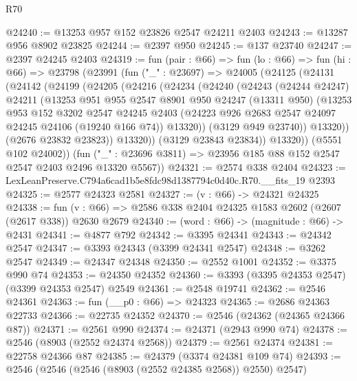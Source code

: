 \begin{lexlean}{R70}
\begin{coremodule}
@24240 := @13253 @957 @152 @23826 @2547 @24211 @2403
@24243 := @13287 @956 @8902 @23825
@24244 := @2397 @950
@24245 := @137 @23740
@24247 := @2397 @24245 @2403
@24319 := fun (pair : @66) =>
  fun (lo : @66) =>
  fun (hi : @66) =>
  @23798
    (@23991
      (fun ("_" : @23697) =>
      @24005
        (@24125
          (@24131
            (@24142
              (@24199
                (@24205
                  (@24216
                    (@24234
                      (@24240
                        (@24243
                          (@24244 @24247)
                          @24211
                          (@13253
                            @951
                            @955
                            @2547
                            @8901
                            @950
                            @24247
                            (@13311 @950)
                            (@13253
                              @953
                              @152
                              @3202
                              @2547
                              @24245
                              @2403
                              (@24223 @926 @2683 @2547 @24097 @24245 @24106 (@19240 @166 @74))
                              @13320))
                          (@3129 @949 @23740))
                        @13320))
                    (@2676 @23832 @23823))
                  @13320))
              (@3129 @23843 @23834))
            @13320))
        (@5551 @102 @24002))
      (fun ("_" : @23696 @3811) => @23956 @185 @88 @152 @2547 @2547 @2403 @2496 @13320 @5567))
@24321 := @2574 @338 @2404
@24323 := LexLeanPreserve.C794a6cad1b5e8fdc98d1387794c0d40c.R70.__fits_19 @2393
@24325 := @2577 @24323 @2581
@24327 := (v : @66) -> @24321 @24325
@24338 := fun (v : @66) => @2586 @338 @2404 @24325 @1583 @2602 (@2607 (@2617 @338)) @2630 @2679
@24340 := (word : @66) -> (magnitude : @66) -> @2431
@24341 := @4877 @792
@24342 := @3395 @24341
@24343 := @24342 @2547
@24347 := @3393 @24343 (@3399 @24341 @2547)
@24348 := @3262 @2547
@24349 := @24347 @24348
@24350 := @2552 @1001
@24352 := @3375 @990 @74
@24353 := @24350 @24352
@24360 := @3393 (@3395 @24353 @2547) (@3399 @24353 @2547) @2549
@24361 := @2548 @19741
@24362 := @2546 @24361
@24363 := fun (__p0 : @66) => @24323
@24365 := @2686 @24363 @22733
@24366 := @22735 @24352
@24370 := @2546 (@24362 (@24365 @24366 @87))
@24371 := @2561 @990
@24374 := @24371 (@2943 @990 @74)
@24378 := @2546 (@8903 (@2552 @24374 @2568))
@24379 := @2561 @24374
@24381 := @22758 @24366 @87
@24385 := @24379 (@3374 @24381 @109 @74)
@24393 := @2546 (@2546 (@2546 (@8903 (@2552 @24385 @2568)) @2550) @2547)

\end{coremodule}
\end{lexlean}
